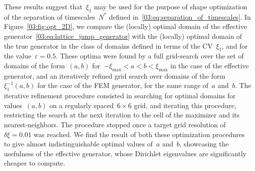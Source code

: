 These results suggest that~$\xi_1$ may be used for the purpose of shape optimization of the separation of timescales~$N^*$ defined in~\eqref{03:eq:separation_of_timescales}.
In Figure~\ref{03:fig:opt_2D}, we compare the (locally) optimal domain of the effective generator~\eqref{03:eq:lattice_jump_generator} with the (locally) optimal domain of the true generator in the class of domains defined in terms of the CV~$\xi_1$, and for the value~$\varepsilon=0.5$.
These optima were found by a full grid-search over the set of domains of the form~$(a,b)$ for~$-\xi_{\mathrm{max}}<a<b<\xi_{\mathrm{max}}$ in the case of the effective generator, and an iteratively refined grid search over domains of the form~$\xi_1^{-1}(a,b)$ for the case of the FEM generator, for the same range of~$a$ and~$b$.
The iterative refinement procedure consisted in searching for optimal domains for values~$(a,b)$ on a regularly spaced~$6\times 6$ grid, and iterating this procedure, restricting the search at the next iteration to the cell of the maximizer and its nearest-neighbors. The procedure stopped once a target grid resolution of~$\delta\xi=0.01$ was reached. 
We find the result of both these optimization procedures to give almost indistinguishable optimal values of~$a$ and~$b$, showcasing the usefulness of the effective generator, whose Dirichlet eigenvalues are significantly cheaper to compute.
